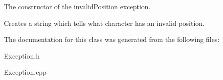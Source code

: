 The constructor of the \hyperlink{classinvalid_position}{invalid\+Position} exception. 

Creates a string which tells what character has an invalid position. 

The documentation for this class was generated from the following files\+:\begin{DoxyCompactItemize}
\item 
Exception.\+h\item 
Exception.\+cpp\end{DoxyCompactItemize}
